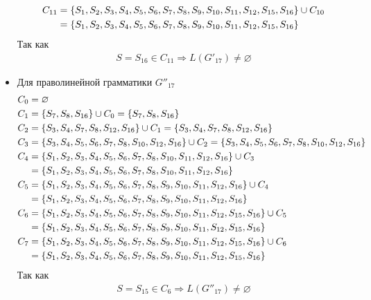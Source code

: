 \begin{itemize}
\begin{align*}
		      C_{11} & = \left\{S_1, S_2, S_3, S_4, S_5, S_6, S_7, S_8, S_9, S_{10}, S_{11}, S_{12}, S_{15}, S_{16}\right\} \cup C_{10} \\
		             & = \left\{S_1, S_2, S_3, S_4, S_5, S_6, S_7, S_8, S_9, S_{10}, S_{11}, S_{12}, S_{15}, S_{16}\right\}
	      \end{align*}
	      Так как
	      \begin{align}
		      S = S_{16} \in C_{11} \Longrightarrow L(G'_{17}) \not= \varnothing
	      \end{align}
	\item Для праволинейной грамматики \(G''_{17}\)
	      \begin{align*}
		      C_{0} & = \varnothing                                                                                                                        \\
		      C_{1} & = \left\{S_{7}, S_{8}, S_{16}\right\} \cup C_{0} = \left\{S_{7}, S_{8}, S_{16}\right\}                                                                 \\
		      C_{2} & = \left\{S_3, S_4, S_7, S_8, S_{12}, S_{16}\right\} \cup C_{1} = \left\{S_3, S_4, S_7, S_8, S_{12}, S_{16}\right\}                                     \\
		      C_{3} & = \left\{S_3, S_4, S_5, S_6, S_7, S_8, S_{10}, S_{12}, S_{16}\right\} \cup C_{2} = \left\{S_3, S_4, S_5, S_6, S_7, S_8, S_{10}, S_{12}, S_{16}\right\} \\
		      C_{4} & = \left\{S_1, S_2, S_3, S_4, S_5, S_6, S_7, S_8, S_{10}, S_{11}, S_{12}, S_{16}\right\} \cup C_{3}                                            \\
		            & = \left\{S_1, S_2, S_3, S_4, S_5, S_6, S_7, S_8, S_{10}, S_{11}, S_{12}, S_{16}\right\}                                                       \\
		      C_{5} & = \left\{S_1, S_2, S_3, S_4, S_5, S_6, S_7, S_8, S_9, S_{10}, S_{11}, S_{12}, S_{16}\right\} \cup C_{4}                                       \\
		            & = \left\{S_1, S_2, S_3, S_4, S_5, S_6, S_7, S_8, S_9, S_{10}, S_{11}, S_{12}, S_{16}\right\}                                                  \\
		      C_{6} & = \left\{S_1, S_2, S_3, S_4, S_5, S_6, S_7, S_8, S_9, S_{10}, S_{11}, S_{12}, S_{15}, S_{16}\right\} \cup C_{5}                               \\
		            & = \left\{S_1, S_2, S_3, S_4, S_5, S_6, S_7, S_8, S_9, S_{10}, S_{11}, S_{12}, S_{15}, S_{16}\right\}                                          \\
		      C_{7} & = \left\{S_1, S_2, S_3, S_4, S_5, S_6, S_7, S_8, S_9, S_{10}, S_{11}, S_{12}, S_{15}, S_{16}\right\} \cup C_{6}                               \\
		            & = \left\{S_1, S_2, S_3, S_4, S_5, S_6, S_7, S_8, S_9, S_{10}, S_{11}, S_{12}, S_{15}, S_{16}\right\}
	      \end{align*}
	      Так как
	      \begin{align}
		      S = S_{15} \in C_6 \Longrightarrow L(G''_{17}) \not= \varnothing
	      \end{align}
\end{itemize}

